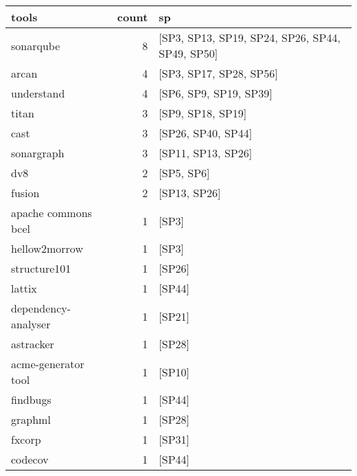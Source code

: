 \begin{tabular}{lrl}
\toprule
               tools &  count &                                                     sp \\
\midrule
           sonarqube &      8 &        [SP3, SP13, SP19, SP24, SP26, SP44, SP49, SP50] \\
               arcan &      4 &                                [SP3, SP17, SP28, SP56] \\
          understand &      4 &                                 [SP6, SP9, SP19, SP39] \\
               titan &      3 &                                      [SP9, SP18, SP19] \\
                cast &      3 &                                     [SP26, SP40, SP44] \\
          sonargraph &      3 &                                     [SP11, SP13, SP26] \\
                 dv8 &      2 &                                             [SP5, SP6] \\
              fusion &      2 &                                           [SP13, SP26] \\
 apache commons bcel &      1 &                                                  [SP3] \\
       hellow2morrow &      1 &                                                  [SP3] \\
        structure101 &      1 &                                                 [SP26] \\
              lattix &      1 &                                                 [SP44] \\
 dependency-analyser &      1 &                                                 [SP21] \\
           astracker &      1 &                                                 [SP28] \\
 acme-generator tool &      1 &                                                 [SP10] \\
            findbugs &      1 &                                                 [SP44] \\
             graphml &      1 &                                                 [SP28] \\
              fxcorp &      1 &                                                 [SP31] \\
             codecov &      1 &                                                 [SP44] \\

\end{tabular}
